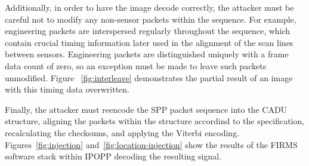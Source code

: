 Additionally, in order to have the image decode correctly, the attacker must be careful not to modify any non-sensor packets within the sequence.
For example, engineering packets are interspersed regularly throughout the sequence, which contain crucial timing information later used in the alignment of the scan lines between sensors.
Engineering packets are distinguished uniquely with a frame data count of zero, so an exception must be made to leave such packets unmodified.
Figure ~\ref{fig:interleave} demonstrates the partial result of an image with this timing data overwritten.

Finally, the attacker must reencode the SPP packet sequence into the CADU structure, aligning the packets within the structure accordind to the specification, recalculating the checksums, and applying the Viterbi encoding.
Figures~\ref{fig:injection} and~\ref{fig:location-injection} show the results of the FIRMS software stack within IPOPP decoding the resulting signal.

